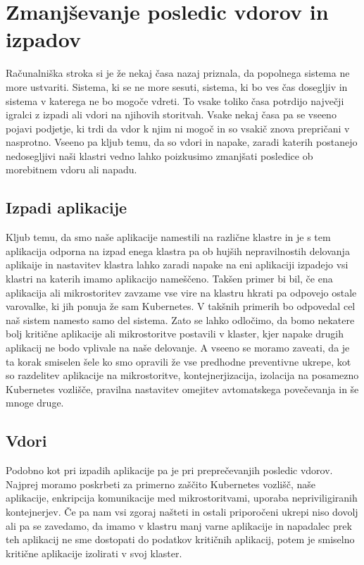\documentclass[a4paper, 12pt]{book}
\begin{document}
\section{Zmanjševanje posledic vdorov in izpadov}
Računalniška stroka si je že nekaj časa nazaj priznala, da popolnega sistema ne more ustvariti.
Sistema, ki se ne more sesuti, sistema, ki bo ves čas dosegljiv in sistema v katerega ne bo mogoče vdreti.
To vsake toliko časa potrdijo največji igralci z izpadi ali vdori na njihovih storitvah. 
Vsake nekaj časa pa se vseeno pojavi podjetje, ki trdi da vdor k njim ni mogoč in so vsakič znova prepričani v nasprotno.
Vseeno pa kljub temu, da so vdori in napake, zaradi katerih postanejo nedosegljivi naši klastri vedno lahko poizkusimo zmanjšati posledice ob morebitnem vdoru ali napadu. 
\subsection{Izpadi aplikacije}
Kljub temu, da smo naše aplikacije namestili na različne klastre in je s tem aplikacija odporna na izpad enega klastra pa ob hujših nepravilnostih delovanja aplikaije in nastavitev klastra lahko zaradi napake na eni aplikaciji izpadejo vsi klastri na katerih imamo aplikacijo nameščeno.
Takšen primer bi bil, če ena aplikacija ali mikrostoritev zavzame vse vire na klastru hkrati pa odpovejo ostale varovalke, ki jih ponuja že sam Kubernetes.
V takšnih primerih bo odpovedal cel naš sistem namesto samo del sistema.
Zato se lahko odločimo, da bomo nekatere bolj kritične aplikacije ali mikrostoritve postavili v klaster, kjer napake drugih aplikacij ne bodo vplivale na naše delovanje.
A vseeno se moramo zaveati, da je ta korak smiselen šele ko smo opravili že vse predhodne preventivne ukrepe, kot so razdelitev aplikacije na mikrostoritve, kontejnerjizacija, izolacija na posamezno Kubernetes vozlišče, pravilna nastavitev omejitev avtomatskega povečevanja in še mnoge druge.
\subsection{Vdori}
Podobno kot pri izpadih aplikacije pa je pri preprečevanjih posledic vdorov.
Najprej moramo poskrbeti za primerno zaščito Kubernetes vozlišč, naše aplikacije, enkripcija komunikacije med mikrostoritvami, uporaba nepriviligiranih kontejnerjev.
Če pa nam vsi zgoraj našteti in ostali priporočeni ukrepi niso dovolj ali pa se zavedamo, da imamo v klastru manj varne aplikacije in napadalec prek teh aplikacij ne sme dostopati do podatkov kritičnih aplikacij, potem je smiselno kritične aplikacije izolirati v svoj klaster.
\end{document}
